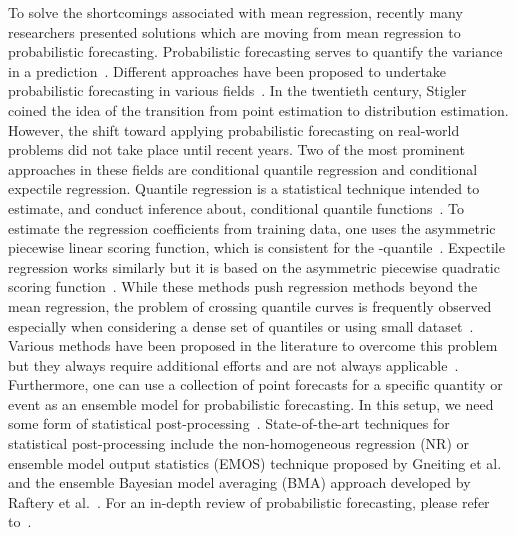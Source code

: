 \documentclass{ieeeaccess}
\begin{document}
To solve the shortcomings associated with mean regression, recently many researchers presented solutions which are moving from mean regression to probabilistic forecasting. Probabilistic forecasting serves to quantify the variance in a prediction~\cite{gneiting2014probabilistic}. Different approaches have been proposed to undertake probabilistic forecasting in various fields~\cite{collins2007ensembles, gneiting2005weather, palmer2002economic, palmer2012towards, cloke2009ensemble, krzysztofowicz2001case, jordan2011operational, pinson2013wind, zhu2012short, groen2013real, timmermann2000density, montgomery2012ensemble, alkema2007probabilistic, raftery2012bayesian, jones2012improved, hood2004systems}. In the twentieth century, Stigler~\cite{stigler1975transition} coined the idea of the transition from point estimation to distribution estimation. However, the shift toward applying probabilistic forecasting on real-world problems did not take place until recent years. Two of the most prominent approaches in these fields are conditional quantile regression and conditional expectile regression. Quantile regression is a statistical technique intended to estimate, and conduct inference about, conditional quantile functions~\cite{koenkerquantile}. To estimate the regression coefficients from training data, one uses the asymmetric piecewise linear scoring function, which is consistent for the -quantile~\cite{koenker1978regression,koenkerquantile}. Expectile regression works similarly but it is based on the asymmetric piecewise quadratic scoring function~\cite{efron1991regression,newey1987asymmetric,sobotka2012geoadditive}. While these methods push regression methods beyond the mean regression, the problem of crossing quantile curves is frequently observed especially when considering a dense set of quantiles or using small dataset~\cite{kneib2013beyond}. Various methods have been proposed in the literature to overcome this problem~\cite{dette2008non,schnabel2013simultaneous} but they always require additional efforts and are not always applicable~\cite{kneib2013beyond}. Furthermore, one can use a collection of point forecasts for a specific quantity or event as an ensemble model for probabilistic forecasting. In this setup, we need some form of statistical post-processing~\cite{gneiting2014probabilistic}. State-of-the-art techniques for statistical post-processing include the non-homogeneous regression (NR) or ensemble model output statistics (EMOS) technique proposed by Gneiting et al.~\cite{gneiting2005weather} and the ensemble Bayesian model averaging (BMA) approach developed by Raftery et al.~\cite{raftery2005using}. For an in-depth review of probabilistic forecasting, please refer to~\cite{gneiting2014probabilistic}.
\end{document}
